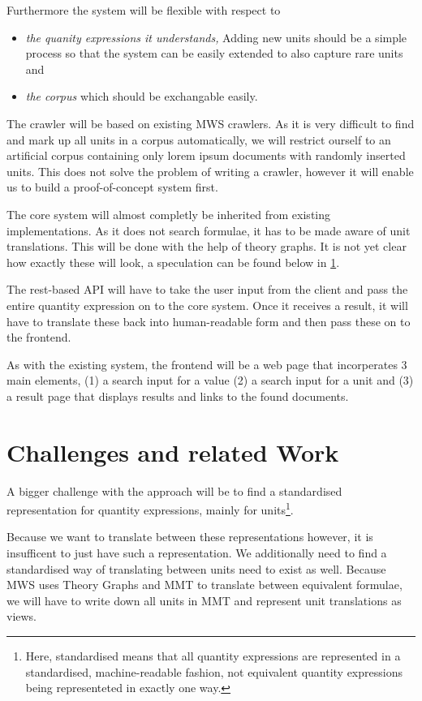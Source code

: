\documentclass[11pt]{article}
\begin{document}
Furthermore the system will be flexible with respect to
\begin{itemize}
  \item \textit{the quanity expressions it understands, } Adding new units should be a simple process so that the system can be easily extended to also capture rare units and
  \item \textit{the corpus} which should be exchangable easily.
\end{itemize}

The crawler will be based on existing MWS crawlers. As it is very difficult to find and mark up all units in a corpus automatically, we will restrict ourself to an artificial corpus containing only lorem ipsum documents with randomly inserted units. This does not solve the problem of writing a crawler, however it will enable us to build a proof-of-concept system first.

The core system will almost completly be inherited from existing implementations. As it does not search formulae, it has to be made aware of unit translations. This will be done with the help of theory graphs. It is not yet clear how exactly these will look, a speculation can be found below in \ref{sec:problems_relatedwork}.

The rest-based API will have to take the user input from the client and pass the entire quantity expression on to the core system. Once it receives a result, it will have to translate these back into human-readable form and then pass these on to the frontend.

As with the existing system, the frontend will be a web page that incorperates 3 main elements, (1) a search input for a value (2) a search input for a unit and (3) a result page that displays results and links to the found documents.

\section{Challenges and related Work}
\label{sec:problems_relatedwork}

A bigger challenge with the approach will be to find a standardised representation for quantity expressions, mainly for units\footnote{Here, standardised means that all quantity expressions are represented in a standardised, machine-readable fashion, not equivalent quantity expressions being representeted in exactly one way. }.

Because we want to translate between these representations however, it is insufficent to just have such a representation. We additionally need to find a standardised way of translating between units need to exist as well. Because MWS uses Theory Graphs and MMT to translate between equivalent formulae, we will have to write down all units in MMT and represent unit translations as views.
\end{document}
